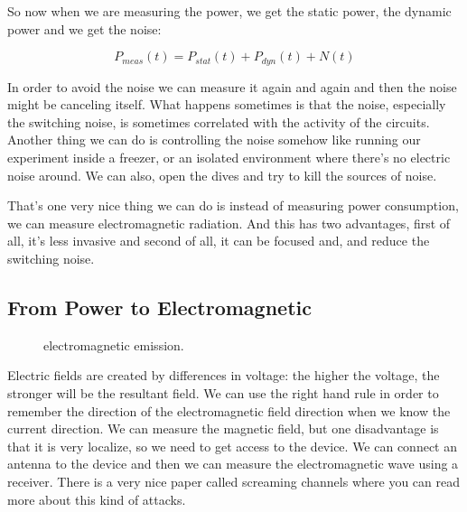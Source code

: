 So now when we are measuring the power, we get the static power, the dynamic
power and we get the noise:

\begin{displaymath}
    P_{meas}(t)=P_{stat}(t) + P_{dyn}(t) + N(t)
\end{displaymath}

In order to avoid the noise we can measure it again and again and then the noise
might be canceling itself. What happens sometimes is that the noise, especially
the switching noise, is sometimes correlated with the activity of the circuits.
Another thing we can do is controlling the noise somehow like running our
experiment inside a freezer, or an isolated environment where there's no
electric noise around. We can also, open the dives and try to kill the sources
of noise.

That's one very nice thing we can do is instead of measuring power consumption,
we can measure electromagnetic radiation. And this has two advantages, first of
all, it's less invasive and second of all, it can be focused and, and reduce the
switching noise.

\subsection { From Power to Electromagnetic }

\begin{figure}[!ht]
    \centering
    
    \caption{electromagnetic emission.} \label{fig:electromagnetic emission}
\end{figure}

Electric fields are created by differences in voltage: the higher the voltage,
the stronger will be the resultant field. We can use the right hand rule in
order to remember the direction of the electromagnetic field direction when we
know the current direction. We can measure the magnetic field, but one
disadvantage is that it is very localize, so we need to get access to the
device. We can connect an antenna to the device and then we can measure the
electromagnetic wave using a receiver. There is a very nice paper called
screaming channels where you can read more about this kind of attacks.